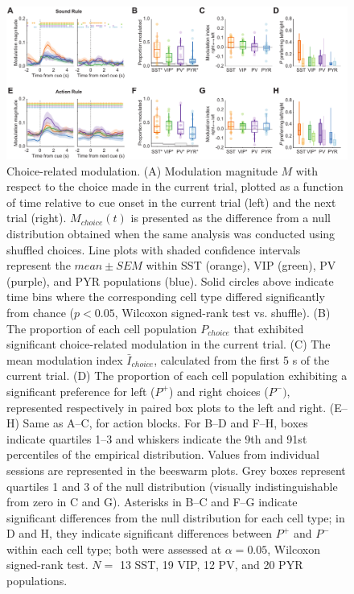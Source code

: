 \begin{figure}[htbp]

\begin{center}
\includegraphics[width=\textwidth]{Figures/Chapter4/Fig6}
\end{center}

\caption[Choice-related modulation]
{Choice-related modulation. (A) Modulation magnitude $M$ with respect to the choice made in the current trial, plotted as a function of time relative to cue onset in the current trial (left) and the next trial (right). $M_{\mathit{choice}}(t)$ is presented as the difference from a null distribution obtained when the same analysis was conducted using shuffled choices. Line plots with shaded confidence intervals represent the $\mathit{mean} \pm \mathit{SEM}$ within SST (orange), VIP (green), PV (purple), and PYR populations (blue). Solid circles above indicate time bins where the corresponding cell type differed significantly from chance ($p<0.05$, Wilcoxon signed-rank test vs. shuffle). (B) The proportion of each cell population $P_{\mathit{choice}}$ that exhibited significant choice-related modulation in the current trial. (C) The mean modulation index $\bar{I}_{\mathit{choice}}$, calculated from the first 5 s of the current trial. (D) The proportion of each cell population exhibiting a significant preference for left ($P^+$) and right choices ($P^-)$, represented respectively in paired box plots to the left and right. (E--H) Same as A--C, for action blocks. For B--D and F--H, boxes indicate quartiles 1--3 and whiskers indicate the 9th and 91st percentiles of the empirical distribution. Values from individual sessions are represented in the beeswarm plots. Grey boxes represent quartiles 1 and 3 of the null distribution (visually indistinguishable from zero in C and G). Asterisks in B--C and F--G indicate significant differences from the null distribution for each cell type; in D and H, they indicate significant differences between $P^+$ and $P^-$ within each cell type; both were assessed at $\alpha = 0.05$, Wilcoxon signed-rank test. $N=$ 13 SST, 19 VIP, 12 PV, and 20 PYR populations.}

\label{fig:Fig6}
\end{figure}